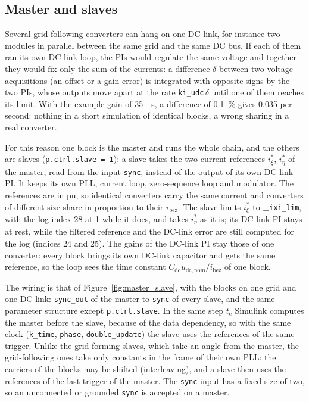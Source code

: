 \documentclass[11pt,a4paper]{scrartcl}
\newcommand{\ped}[1]{_{\mathrm{#1}}}
\newcommand{\code}[1]{\texttt{#1}}
\begin{document}
\begin{onehalfspace}
\subsection{Master and slaves}
\label{sec:gfl_master_slave}

Several grid-following converters can hang on one DC link, for instance two modules in parallel between the same grid and the same DC bus. If each of them ran its own DC-link loop, the PIs would regulate the same voltage and together they would fix only the sum of the currents: a difference $\delta$ between two voltage acquisitions (an offset or a gain error) is integrated with opposite signs by the two PIs, whose outputs move apart at the rate \code{ki\_udc}$\,\delta$ until one of them reaches its limit. With the example gain of \SI{35}{\per\second}, a difference of \SI{0.1}{\percent} gives \SI{0.035}{\pu} per second: nothing in a short simulation of identical blocks, a wrong sharing in a real converter.

For this reason one block is the master and runs the whole chain, and the others are slaves (\code{p.ctrl.slave = 1}): a slave takes the two current references $i^{*}_\xi$, $i^{*}_\eta$ of the master, read from the input \code{sync}, instead of the output of its own DC-link PI. It keeps its own PLL, current loop, zero-sequence loop and modulator. The references are in pu, so identical converters carry the same current and converters of different size share in proportion to their $i\ped{bez}$. The slave limits $i^{*}_\xi$ to $\pm$\code{ixi\_lim}, with the log index 28 at 1 while it does, and takes $i^{*}_\eta$ as it is; its DC-link PI stays at rest, while the filtered reference and the DC-link error are still computed for the log (indices 24 and 25). The gains of the DC-link PI stay those of one converter: every block brings its own DC-link capacitor and gets the same reference, so the loop sees the time constant $C\ped{dc} u\ped{dc,nom}/i\ped{bez}$ of one block.

The wiring is that of Figure~\ref{fig:master_slave}, with the blocks on one grid and one DC link: \code{sync\_out} of the master to \code{sync} of every slave, and the same parameter structure except \code{p.ctrl.slave}. In the same step $t\ped{c}$ Simulink computes the master before the slave, because of the data dependency, so with the same clock (\code{k\_time}, \code{phase}, \code{double\_update}) the slave uses the references of the same trigger. Unlike the grid-forming slaves, which take an angle from the master, the grid-following ones take only constants in the frame of their own PLL: the carriers of the blocks may be shifted (interleaving), and a slave then uses the references of the last trigger of the master. The \code{sync} input has a fixed size of two, so an unconnected or grounded \code{sync} is accepted on a master.


\end{onehalfspace}
\end{document}
